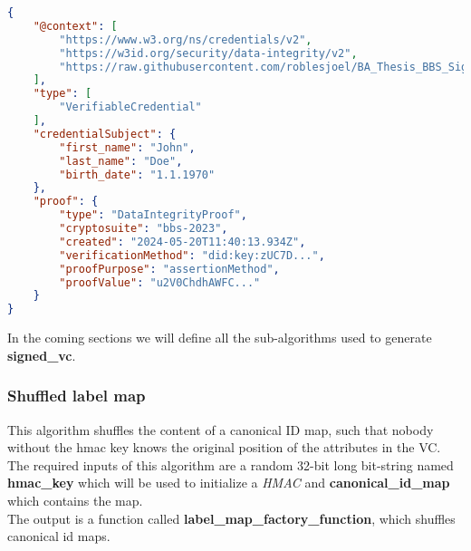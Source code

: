 \documentclass[
	a4paper               %
	,BCOR=0mm            %
	,bibliography=totoc   %
	,listof=totoc         %
	,monolingual
	,twoside=false
]{bfhthesis}              %
\begin{document}
\begin{lstlisting}[language=json,firstnumber=1,caption={Signed VC},captionpos=b, label={list:signed-vc}]
{
	"@context": [
		"https://www.w3.org/ns/credentials/v2",
		"https://w3id.org/security/data-integrity/v2",
		"https://raw.githubusercontent.com/roblesjoel/BA_Thesis_BBS_Signatures/docs/context/example_1.jsonld"
	],
	"type": [
		"VerifiableCredential"
	],
	"credentialSubject": {
		"first_name": "John",
		"last_name": "Doe",
		"birth_date": "1.1.1970"
	},
	"proof": {
		"type": "DataIntegrityProof",
		"cryptosuite": "bbs-2023",
		"created": "2024-05-20T11:40:13.934Z",
		"verificationMethod": "did:key:zUC7D...",
		"proofPurpose": "assertionMethod",
		"proofValue": "u2V0ChdhAWFC..."
	}
}
\end{lstlisting}

In the coming sections we will define all the sub-algorithms used to generate \textbf{signed\_vc}.

\subsubsection{Shuffled label map}
\label{sec:shuffledlabelmap}
This algorithm shuffles the content of a canonical ID map, such that nobody without the hmac key knows the original position of the attributes in the VC.\\

The required inputs of this algorithm are a random 32-bit long bit-string named \textbf{hmac\_key} which will be used to initialize a \textit{HMAC} and \textbf{canonical\_id\_map} which contains the map.\\

The output is a function called \textbf{label\_map\_factory\_function}, which shuffles canonical id maps.\\
\end{document}
